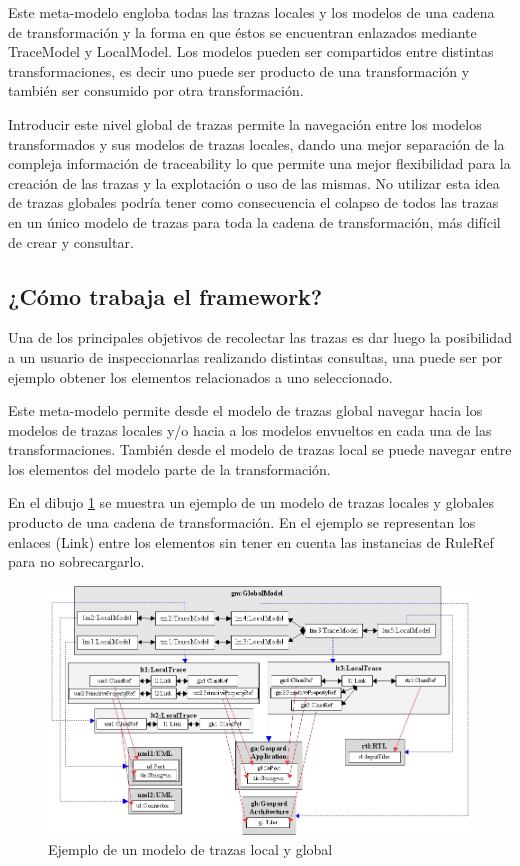 \documentclass[a4paper,12pt,oneside]{book}
\begin{document}
Este meta-modelo engloba todas las trazas locales y los modelos de una cadena de transformación y la forma en que éstos se encuentran enlazados mediante TraceModel y LocalModel. Los modelos pueden ser compartidos entre distintas transformaciones, es decir uno puede ser producto de una transformación y también ser consumido por otra transformación.

Introducir este nivel global de trazas permite la navegación entre los modelos transformados y sus modelos de trazas locales, dando una mejor separación de la compleja información de traceability lo que permite una mejor flexibilidad para la creación de las trazas y la explotación o uso de las mismas. No utilizar esta idea de trazas globales podría tener como consecuencia el colapso de todos las trazas en un único modelo de trazas para toda la cadena de transformación, más difícil de crear y consultar.

\subsection{¿Cómo trabaja el framework?}

Una de los principales objetivos de recolectar las trazas es dar luego la posibilidad a un usuario de inspeccionarlas realizando distintas consultas, una puede ser por ejemplo obtener los elementos relacionados a uno seleccionado.

Este meta-modelo permite desde el modelo de trazas global navegar hacia los modelos de trazas locales y/o hacia a los modelos envueltos en cada una de las transformaciones. También desde el modelo de trazas local se puede navegar entre los elementos del modelo parte de la transformación.

En el dibujo \ref{fig:EjemploLocalGlobalMetamodel} se muestra un ejemplo de un modelo de trazas locales y globales producto de una cadena de transformación. En el ejemplo se representan los enlaces (Link) entre los elementos sin tener en cuenta las instancias de RuleRef para no sobrecargarlo.

\begin{figure}[hbtp]
\centering
\includegraphics[scale=.45]{./img/EjemploLocalGlobalMetamodel}
\caption{Ejemplo de un modelo de trazas local y global}
\label{fig:EjemploLocalGlobalMetamodel}
\end{figure}
\end{document}
